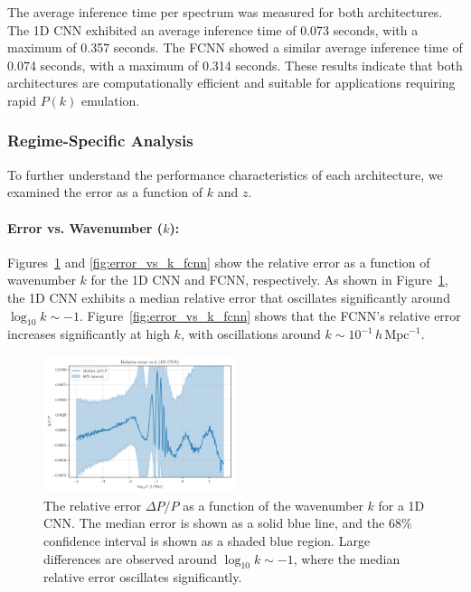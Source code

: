 \documentclass[twocolumn]{aastex631}
\begin{document}
The average inference time per spectrum was measured for both architectures. The 1D CNN exhibited an average inference time of 0.073 seconds, with a maximum of 0.357 seconds. The FCNN showed a similar average inference time of 0.074 seconds, with a maximum of 0.314 seconds. These results indicate that both architectures are computationally efficient and suitable for applications requiring rapid $P(k)$ emulation.

\subsubsection{Regime-Specific Analysis}

To further understand the performance characteristics of each architecture, we examined the error as a function of $k$ and $z$.

\paragraph{Error vs. Wavenumber ($k$):}

Figures~\ref{fig:error_vs_k_cnn1d} and \ref{fig:error_vs_k_fcnn} show the relative error as a function of wavenumber $k$ for the 1D CNN and FCNN, respectively. As shown in Figure~\ref{fig:error_vs_k_cnn1d}, the 1D CNN exhibits a median relative error that oscillates significantly around $\log_{10} k \sim -1$. Figure~\ref{fig:error_vs_k_fcnn} shows that the FCNN's relative error increases significantly at high $k$, with oscillations around $k \sim 10^{-1}\,h\,\mathrm{Mpc}^{-1}$.

\begin{figure}[h]
    \centering
    \includegraphics[width=0.5\textwidth]{Project4/plots/error_vs_k_cnn1d_3_1745408317.png}
    \caption{\label{fig:error_vs_k_cnn1d}The relative error $\Delta P/P$ as a function of the wavenumber $k$ for a 1D CNN. The median error is shown as a solid blue line, and the 68\% confidence interval is shown as a shaded blue region. Large differences are observed around $\log_{10} k \sim -1$, where the median relative error oscillates significantly.}
\end{figure}
\end{document}
